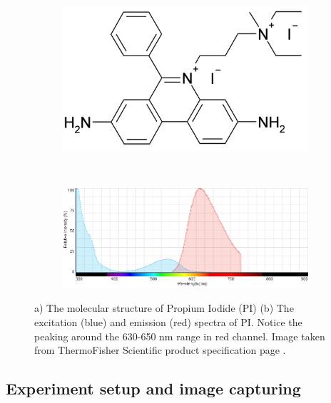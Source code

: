 \documentclass[pdftex,12pt,a4paper]{report}
\begin{document}
\begin{figure}[H]
\centering

\begin{subfigure}{0.4\textwidth}
  \centering
  \includegraphics[width=\textwidth]{images/pi}
  \caption{}
  \label{fig:pi_molecule}
\end{subfigure}%
~
\begin{subfigure}{0.6\textwidth}
  \centering
  \includegraphics[width=\textwidth]{images/pi_spectra}
  \caption{}
  \label{fig:pi_spectra}
\end{subfigure}%

\caption[The structure and mechanism of Propium Iodide (PI)]{a) The molecular structure of Propium Iodide (PI) (b) The excitation (blue) and emission (red) spectra of PI. Notice the peaking around the 630-650 nm range in red channel. Image taken from ThermoFisher Scientific product specification page \cite{thermofisher2018pi}.}

\label{fig:pi_stain}
\end{figure}

\subsection{Experiment setup and image capturing}
\label{subsection:exp_setup}
\end{document}
